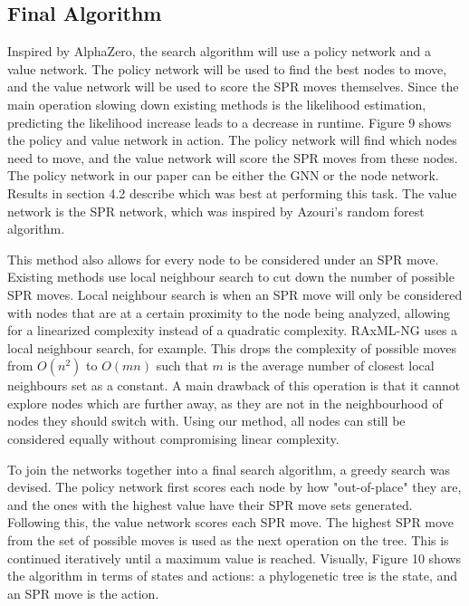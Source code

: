 \documentclass{mpaper}
\begin{document}
\subsection{Final Algorithm}

Inspired by AlphaZero, the search algorithm will use a policy network and a value network. The policy network will be used to find the best nodes to move, and the value network will be used to score the SPR moves themselves. Since the main operation slowing down existing methods is the likelihood estimation, predicting the likelihood increase leads to a decrease in runtime. Figure 9 shows the policy and value network in action. The policy network will find which nodes need to move, and the value network will score the SPR moves from these nodes. The policy network in our paper can be either the GNN or the node network. Results in section 4.2 describe which was best at performing this task. The value network is the SPR network, which was inspired by Azouri's random forest algorithm. 

This method also allows for every node to be considered under an SPR move. Existing methods use local neighbour search to cut down the number of possible SPR moves. Local neighbour search is when an SPR move will only be considered with nodes that are at a certain proximity to the node being analyzed, allowing for a linearized complexity instead of a quadratic complexity. RAxML-NG uses a local neighbour search, for example. This drops the complexity of possible moves from $O(n^2)$ to $O(mn)$ such that $m$ is the average number of closest local neighbours set as a constant. A main drawback of this operation is that it cannot explore nodes which are further away, as they are not in the neighbourhood of nodes they should switch with. Using our method, all nodes can still be considered equally without compromising linear complexity. 

To join the networks together into a final search algorithm, a greedy search was devised. The policy network first scores each node by how "out-of-place" they are, and the ones with the highest value have their SPR move sets generated. Following this, the value network scores each SPR move. The highest SPR move from the set of possible moves is used as the next operation on the tree. This is continued iteratively until a maximum value is reached. Visually, Figure 10 shows the algorithm in terms of states and actions: a phylogenetic tree is the state, and an SPR move is the action.
\end{document}

